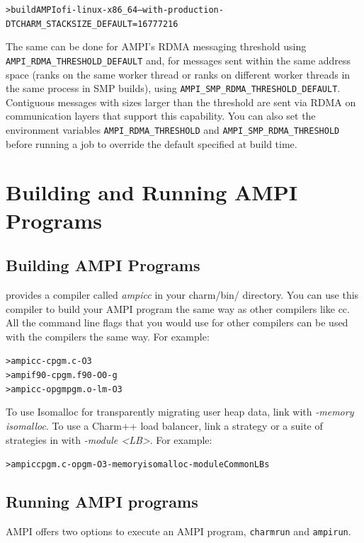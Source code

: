 \documentclass[10pt]{article}
\begin{document}
\begin{alltt}
> build AMPI ofi-linux-x86_64 --with-production -DTCHARM_STACKSIZE_DEFAULT=16777216
\end{alltt}

The same can be done for AMPI's RDMA messaging threshold using \texttt{AMPI\_RDMA\_THRESHOLD\_DEFAULT} and,
for messages sent within the same address space (ranks on the same worker thread or ranks
on different worker threads in the same process in SMP builds), using \texttt{AMPI\_SMP\_RDMA\_THRESHOLD\_DEFAULT}.
Contiguous messages with sizes larger than the threshold are sent via RDMA on communication layers that
support this capability. You can also set the environment variables \texttt{AMPI\_RDMA\_THRESHOLD} and \texttt{AMPI\_SMP\_RDMA\_THRESHOLD}
before running a job to override the default specified at build time.

\section{Building and Running AMPI Programs}
\subsection{Building AMPI Programs}
\ampi{} provides a compiler called \emph{ampicc} in your charm/bin/ directory.
You can use this compiler to build your AMPI program the same way as other
compilers like cc. All the command line flags that you would use
for other compilers can be used with the \ampi{} compilers the same way.
For example:

\begin{alltt}
> ampicc -c pgm.c -O3
> ampif90 -c pgm.f90 -O0 -g
> ampicc -o pgm pgm.o -lm -O3 
\end{alltt}

To use Isomalloc for transparently migrating user heap data, link with
\emph{-memory isomalloc}. To use a Charm++ load balancer, link a strategy
or a suite of strategies in with \emph{-module \textless LB\textgreater}. For example:

\begin{alltt}
> ampicc pgm.c -o pgm -O3 -memory isomalloc -module CommonLBs
\end{alltt}


\subsection{Running AMPI programs}

AMPI offers two options to execute an AMPI program, \texttt{charmrun} and \texttt{ampirun}.
\end{document}
